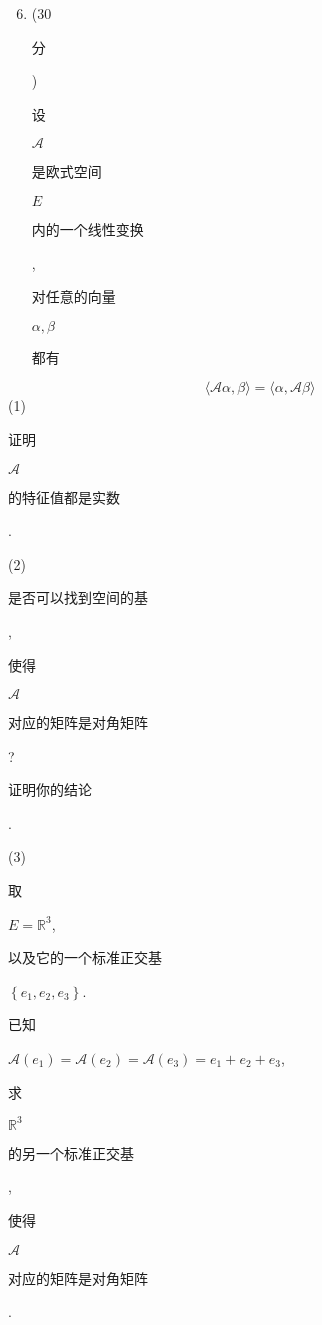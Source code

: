\documentclass[10pt]{article}
\begin{document}
\begin{enumerate}
  \setcounter{enumi}{5}
  \item (30\begin{CJK}{UTF8}{mj}分\end{CJK}) \begin{CJK}{UTF8}{mj}设\end{CJK} $\mathscr{A}$ \begin{CJK}{UTF8}{mj}是欧式空间\end{CJK} $E$ \begin{CJK}{UTF8}{mj}内的一个线性变换\end{CJK}, \begin{CJK}{UTF8}{mj}对任意的向量\end{CJK} $\alpha, \beta$ \begin{CJK}{UTF8}{mj}都有\end{CJK}
\end{enumerate}
$$
\langle\mathscr{A} \alpha, \beta\rangle=\langle\alpha, \mathscr{A} \beta\rangle
$$
(1) \begin{CJK}{UTF8}{mj}证明\end{CJK} $\mathscr{A}$ \begin{CJK}{UTF8}{mj}的特征值都是实数\end{CJK}.

(2) \begin{CJK}{UTF8}{mj}是否可以找到空间的基\end{CJK}, \begin{CJK}{UTF8}{mj}使得\end{CJK} $\mathscr{A}$ \begin{CJK}{UTF8}{mj}对应的矩阵是对角矩阵\end{CJK}? \begin{CJK}{UTF8}{mj}证明你的结论\end{CJK}.

(3) \begin{CJK}{UTF8}{mj}取\end{CJK} $E=\mathbb{R}^{3}$, \begin{CJK}{UTF8}{mj}以及它的一个标准正交基\end{CJK} $\left\{e_{1}, e_{2}, e_{3}\right\}$. \begin{CJK}{UTF8}{mj}已知\end{CJK} $\mathscr{A}\left(e_{1}\right)=\mathscr{A}\left(e_{2}\right)=\mathscr{A}\left(e_{3}\right)=e_{1}+e_{2}+e_{3}$, \begin{CJK}{UTF8}{mj}求\end{CJK} $\mathbb{R}^{3}$ \begin{CJK}{UTF8}{mj}的另一个标准正交基\end{CJK}, \begin{CJK}{UTF8}{mj}使得\end{CJK} $\mathscr{A}$ \begin{CJK}{UTF8}{mj}对应的矩阵是对角矩阵\end{CJK}.
\end{document}

